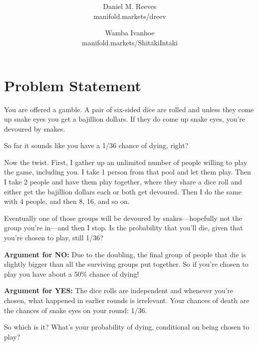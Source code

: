 \documentclass[article,twocolumn]{memoir}
\title{\HUGE\textbf{\longtitle}}
\author{Daniel M. Reeves\\manifold.markets/dreev
\and
Wamba Ivanhoe\\manifold.markets/ShitakiIntaki
}
\date{\protect\tstamp} %
\begin{document}
\pagestyle{headings}
\maketitle


\chapter*{Problem Statement}

You are offered a gamble.
A pair of six-sided dice are rolled and unless they come up snake eyes you get a bajillion dollars. 
If they do come up snake eyes, you're devoured by snakes.

So far it sounds like you have a 1/36 chance of dying, right?

Now the twist. 
First, I gather up an unlimited number of people willing to play the game, including you. 
I take 1 person from that pool and let them play. 
Then I take 2 people and have them play together, where they share a dice roll and either get the bajillion dollars each or both get devoured. 
Then I do the same with 4 people, and then 8, 16, and so on.

Eventually one of those groups will be devoured by snakes---hopefully not the group you're in---and then I stop.
Is the probability that you'll die, given that you're chosen to play, still 1/36?

\vspace{1em}

\textbf{Argument for NO:}
Due to the doubling, the final group of people that die is slightly bigger than all the surviving groups put together. 
So if you're chosen to play you have about a 50\% chance of dying!

\vspace{1em}

\textbf{Argument for YES:}
The dice rolls are independent and whenever you're chosen, what happened in earlier rounds is irrelevant.
Your chances of death are the chances of snake eyes on your round: 1/36.

\vspace{1em}

So which is it? 
What's your probability of dying, conditional on being chosen to play?
\end{document}
